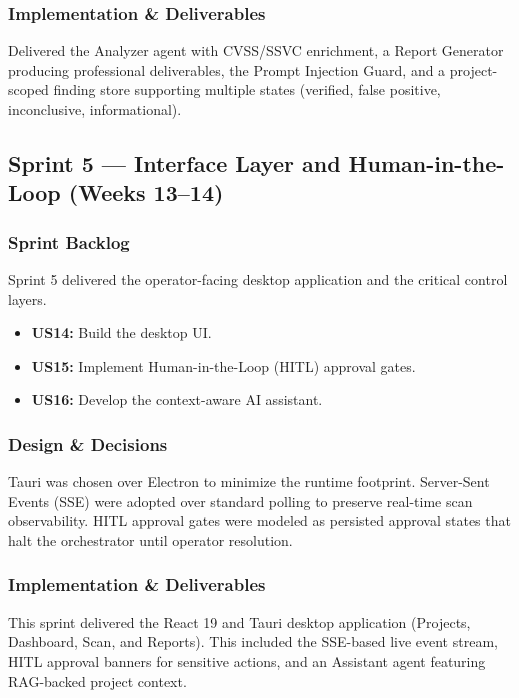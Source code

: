 \documentclass[12pt,a4paper]{report}
\begin{document}
\subsubsection{Implementation \& Deliverables}
Delivered the Analyzer agent with CVSS/SSVC enrichment, a Report Generator producing professional deliverables, the Prompt Injection Guard, and a project-scoped finding store supporting multiple states (verified, false positive, inconclusive, informational).

\subsection{Sprint 5 --- Interface Layer and Human-in-the-Loop (Weeks 13--14)}

\subsubsection{Sprint Backlog}
Sprint 5 delivered the operator-facing desktop application and the critical control layers.
\begin{itemize}
    \item \textbf{US14:} Build the desktop UI.
    \item \textbf{US15:} Implement Human-in-the-Loop (HITL) approval gates.
    \item \textbf{US16:} Develop the context-aware AI assistant.
\end{itemize}

\subsubsection{Design \& Decisions}
Tauri was chosen over Electron to minimize the runtime footprint. Server-Sent Events (SSE) were adopted over standard polling to preserve real-time scan observability. HITL approval gates were modeled as persisted approval states that halt the orchestrator until operator resolution.

\subsubsection{Implementation \& Deliverables}
This sprint delivered the React 19 and Tauri desktop application (Projects, Dashboard, Scan, and Reports). This included the SSE-based live event stream, HITL approval banners for sensitive actions, and an Assistant agent featuring RAG-backed project context.
\end{document}
